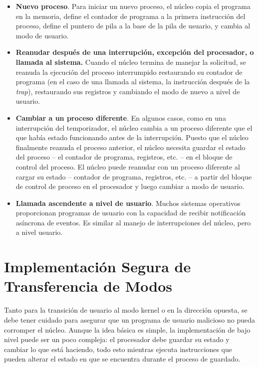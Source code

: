 \documentclass[10pt]{book}
\begin{document}
\begin{itemize}
\item \textbf{Nuevo proceso}. Para iniciar un nuevo proceso, el núcleo copia el programa en la memoria, define el contador de programa a la primera instrucción del proceso, define el puntero de pila a la base de la pila de usuario, y cambia al modo de usuario.

\item \textbf{Reanudar después de una interrupción, excepción del procesador, o llamada al sistema.} Cuando el núcleo termina de manejar la solicitud, se reanuda la ejecución del proceso interrumpido restaurando su contador de programa (en el caso de una llamada al sistema, la instrucción después de la \textit{trap}), restaurando sus registros y cambiando el modo de nuevo a nivel de usuario.

\item \textbf{Cambiar a un proceso diferente}. En algunos casos, como en una interrupción del temporizador, el núcleo cambia a un proceso diferente que el que había estado funcionando antes de la interrupción. Puesto que el núcleo finalmente reanuda el proceso anterior, el núcleo necesita guardar el estado del proceso -- el contador de programa, registros, etc. -- en el bloque de control del proceso. El núcleo puede reanudar con un proceso diferente al cargar su estado -- contador de programa, registros, etc. -- a partir del bloque de control de proceso en el procesador y luego cambiar a modo de usuario.

\item \textbf{Llamada ascendente a nivel de usuario}. Muchos sistemas operativos proporcionan programas de usuario con la capacidad de recibir notificación asíncrona de eventos. Es similar al manejo de interrupciones del núcleo, pero a nivel usuario.
\end{itemize}

\section{Implementación Segura de Transferencia de Modos}
Tanto para la transición de usuario al modo kernel o en la dirección opuesta, se debe tener cuidado para asegurar que un programa de usuario malicioso no pueda corromper el núcleo. Aunque la idea básica es simple, la implementación de bajo nivel puede ser un poco compleja: el procesador debe guardar su estado y cambiar lo que está haciendo, todo esto mientras ejecuta instrucciones que pueden alterar el estado en que se encuentra durante el proceso de guardado.
\end{document}
